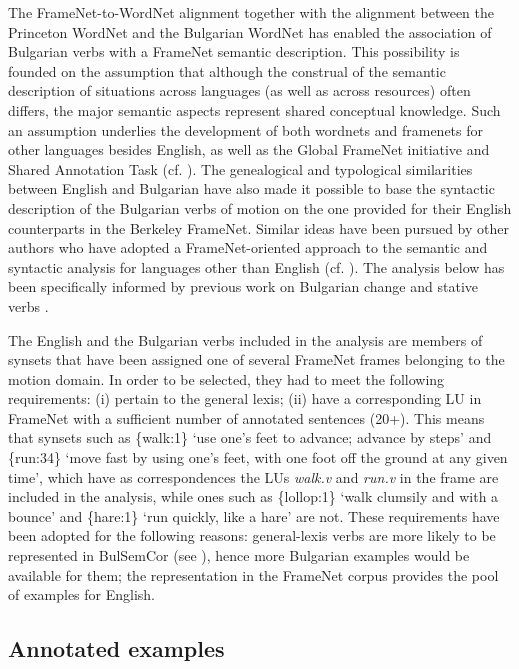 \documentclass[output=paper,colorlinks,citecolor=brown]{langscibook}
\begin{document}
The FrameNet-to-WordNet alignment together with the alignment between the Princeton WordNet and the Bulgarian WordNet has enabled the association of Bulgarian verbs with a FrameNet semantic description. This possibility is founded on the assumption that although the construal of the semantic description of situations across languages (as well as across resources) often differs, the major semantic aspects represent shared conceptual knowledge. Such an assumption underlies the development of both wordnets and framenets for other languages besides English, as well as the Global FrameNet initiative and Shared Annotation Task  (cf. ). The genealogical and typological similarities between English and Bulgarian have also made it possible to base the syntactic description of the Bulgarian verbs of motion on the one provided for their English counterparts in the Berkeley FrameNet. Similar ideas have been pursued by other authors who have adopted a FrameNet-oriented approach to the semantic and syntactic analysis for languages other than English (cf. ). The analysis below has been specifically informed by previous work on Bulgarian change \citep{StoyanovaLeseva:21a} and stative verbs \citep{LesevaSoyanova:2022}.

The English and the Bulgarian verbs included in the analysis are members of synsets that have been assigned one of several FrameNet frames belonging to the motion domain. In order to be selected, they had to meet the following requirements: (i) pertain to the general lexis; (ii) have a corresponding LU in FrameNet with a sufficient number of annotated sentences (20+). This means that synsets such as \{walk:1\} `use one's feet to advance; advance by steps' and \{run:34\} `move fast by using one's feet, with one foot off the ground at any given time', which have as correspondences the LUs \textit{walk.v} and \textit{run.v} in the  frame are included in the analysis, while ones such as \{lollop:1\} `walk clumsily and with a bounce' and \{hare:1\} `run quickly, like a hare' are not. These requirements have been adopted for the following reasons: general-lexis verbs are more likely to be represented in BulSemCor (see ), hence more Bulgarian examples would be available for them; the representation in the FrameNet corpus provides the pool of examples for English.


\subsection{Annotated examples}\label{annotated-data}
\end{document}
